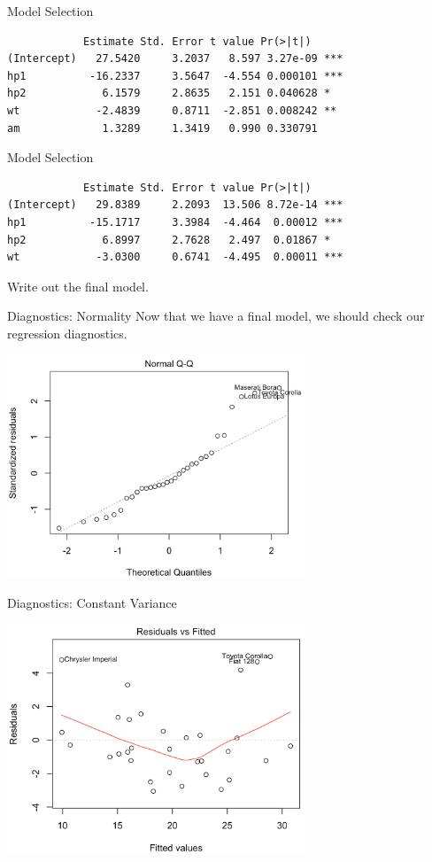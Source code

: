 \begin{frame}[fragile]{Model Selection}
    \small{\begin{verbatim}
            Estimate Std. Error t value Pr(>|t|)  
(Intercept)   27.5420     3.2037   8.597 3.27e-09 ***
hp1          -16.2337     3.5647  -4.554 0.000101 ***
hp2            6.1579     2.8635   2.151 0.040628 *  
wt            -2.4839     0.8711  -2.851 0.008242 ** 
am             1.3289     1.3419   0.990 0.330791 
    \end{verbatim}}
\end{frame}

\begin{frame}[fragile]{Model Selection}
    \small{\begin{verbatim}
            Estimate Std. Error t value Pr(>|t|)  
(Intercept)   29.8389     2.2093  13.506 8.72e-14 ***
hp1          -15.1717     3.3984  -4.464  0.00012 ***
hp2            6.8997     2.7628   2.497  0.01867 *  
wt            -3.0300     0.6741  -4.495  0.00011 ***
    \end{verbatim}}
    Write out the final model.
\end{frame}

\begin{frame}{Diagnostics: Normality}
    Now that we have a final model, we should check our regression diagnostics.
    \begin{center}
        \includegraphics[width=3.5in]{images/mtcarsqq.png}
    \end{center}
\end{frame}

\begin{frame}{Diagnostics: Constant Variance}
    \begin{center}
        \includegraphics[width=3.5in]{images/mtcarsresidft.png}
    \end{center}
\end{frame}

